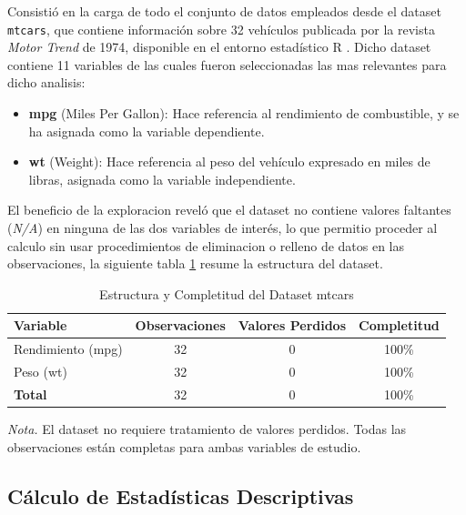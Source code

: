 \documentclass[12pt, letterpaper]{article}
\begin{document}
    Consistió en la carga de todo el conjunto de datos empleados desde el dataset \texttt{mtcars}, que contiene información 
    sobre 32 vehículos publicada por  la revista \textit{Motor Trend} de 1974, disponible
    en el entorno estadístico R \parencite{rcore2023}. Dicho dataset contiene 11 variables de las cuales fueron seleccionadas las mas relevantes para dicho analisis:

    \begin{itemize}
        \item \textbf{mpg} (Miles Per Gallon): Hace referencia al rendimiento de combustible, y se ha asignada
            como la variable dependiente.
        \item \textbf{wt} (Weight): Hace referencia al peso del vehículo expresado en miles de libras,
            asignada como la variable independiente.
    \end{itemize}

    El beneficio de la exploracion reveló que el dataset no contiene valores faltantes (\textit{N/A}) en ninguna de las dos variables de interés, lo que permitio proceder al calculo sin usar procedimientos de eliminacion o relleno de datos en las observaciones, la siguiente tabla \ref{tab:estructura} resume la estructura del dataset.

    \begin{table}[H]
        \centering
        \caption{Estructura y Completitud del Dataset mtcars}
        \begin{tabular}{@{}lccc@{}}
            \toprule 
            \textbf{Variable} & \textbf{Observaciones} & \textbf{Valores Perdidos} & \textbf{Completitud} \\
            \midrule 
            Rendimiento (mpg) & 32 & 0 & 100\% \\
            Peso (wt)         & 32 & 0 & 100\% \\
            \midrule
            \textbf{Total}    & 32 & 0 & 100\% \\
            \bottomrule
        \end{tabular}
        \label{tab:estructura}
        
        \vspace{0.2cm}
        \textit{Nota.} El dataset no requiere tratamiento de valores perdidos. Todas las 
        observaciones están completas para ambas variables de estudio.
    \end{table}

    \subsection{Cálculo de Estadísticas Descriptivas}
\end{document}
